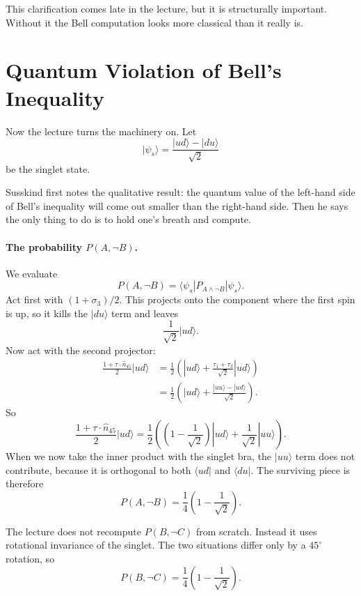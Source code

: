 This clarification comes late in the lecture, but it is structurally important. Without it the Bell computation looks more classical than it really is.

\section{Quantum Violation of Bell's Inequality}

Now the lecture turns the machinery on. Let
\begin{equation}
|\psi_s\rangle
=
\frac{|ud\rangle-|du\rangle}{\sqrt{2}}
\end{equation}
be the singlet state.

Susskind first notes the qualitative result: the quantum value of the left-hand side of Bell's inequality will come out smaller than the right-hand side. Then he says the only thing to do is to hold one's breath and compute.

\paragraph{The probability \(P(A,\neg B)\).}
We evaluate
\[
P(A,\neg B)=\langle \psi_s|P_{A\wedge \neg B}|\psi_s\rangle.
\]
Act first with \((1+\sigma_3)/2\). This projects onto the component where the first spin is up, so it kills the \(|du\rangle\) term and leaves
\[
\frac{1}{\sqrt{2}}|ud\rangle.
\]
Now act with the second projector:
\begin{align}
\frac{1+\tau\cdot \hat n_{45}}{2}|ud\rangle
&=
\frac{1}{2}
\left(
|ud\rangle
+
\frac{\tau_1+\tau_3}{\sqrt{2}}|ud\rangle
\right) \\
&=
\frac{1}{2}
\left(
|ud\rangle
+
\frac{|uu\rangle-|ud\rangle}{\sqrt{2}}
\right).
\end{align}
So
\begin{equation}
\frac{1+\tau\cdot \hat n_{45}}{2}|ud\rangle
=
\frac{1}{2}
\left(
\left(1-\frac{1}{\sqrt{2}}\right)|ud\rangle
+
\frac{1}{\sqrt{2}}|uu\rangle
\right).
\end{equation}
When we now take the inner product with the singlet bra, the \(|uu\rangle\) term does not contribute, because it is orthogonal to both \(\langle ud|\) and \(\langle du|\). The surviving piece is therefore
\begin{equation}
P(A,\neg B)
=
\frac{1}{4}\left(1-\frac{1}{\sqrt{2}}\right).
\end{equation}

The lecture does not recompute \(P(B,\neg C)\) from scratch. Instead it uses rotational invariance of the singlet. The two situations differ only by a \(45^\circ\) rotation, so
\begin{equation}
P(B,\neg C)
=
\frac{1}{4}\left(1-\frac{1}{\sqrt{2}}\right).
\end{equation}

